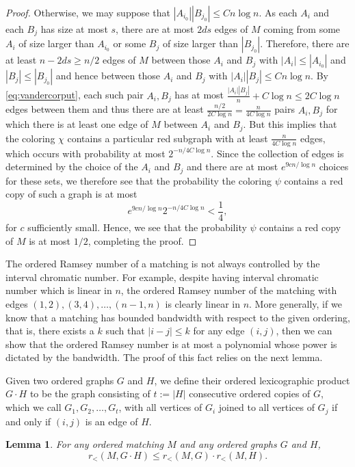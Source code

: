 \documentclass[11pt]{article}
\newtheorem{lemma}[theorem]{Lemma}
\begin{document}
\begin{proof}
Otherwise, we may suppose that $|A_{i_0}||B_{j_0}| \leq Cn \log n$. 
As each $A_i$ and each $B_j$ has size at most $s$, there are at most $2ds$ edges of $M$ coming from some $A_i$ of size larger than $A_{i_0}$ or some $B_j$ of size larger than $|B_{j_0}|$. Therefore, there are at least $n-2ds \geq n/2$ edges of $M$ between those $A_i$ and $B_j$ with $|A_i| \leq |A_{i_0}|$ and $|B_j|\leq |B_{j_0}|$ and hence between those $A_i$ and $B_j$ with $|A_i||B_j| \leq Cn \log n$. By \eqref{eq:vandercorput}, each such pair $A_i,B_j$ has at most $\frac{|A_i||B_j|}{n}+C\log n \leq 2C\log n$ edges between them and thus there are at least $\frac{n/2}{2C\log n}=\frac{n}{4C\log n}$ pairs $A_i,B_j$ for which there is at least one edge of $M$ between $A_i$ and $B_j$. But this implies that the coloring $\chi$ contains a particular red subgraph with at least $\frac{n}{4C\log n}$ edges, which occurs with probability at most $2^{-n/4C \log n}$.
Since the collection of edges is determined by the choice of the $A_i$ and $B_j$ and there are at most $e^{9c n/\log n}$ choices for these sets, we therefore see that the probability the coloring $\psi$ contains a red copy of such a graph is at most
\[
	e^{9c n/\log n} 2^{-n/4C \log n} < \frac{1}{4},
\] 
for $c$ sufficiently small. Hence, we see that the probability $\psi$ contains a red copy of $M$ is at most $1/2$, completing the proof. 
\end{proof}


The ordered Ramsey number of a matching is not always controlled by the interval chromatic number. For example, despite having interval chromatic number which is linear in $n$, the ordered Ramsey number of the matching with edges $(1, 2), (3,4), \dots, (n-1, n)$ is clearly linear in $n$. More generally, if we know that a matching has bounded bandwidth with respect to the given ordering, that is, there exists a $k$ such that $|i-j| \leq k$ for any edge $(i,j)$, then we can show that the ordered Ramsey number is at most a polynomial whose power is dictated by the bandwidth. The proof of this fact relies on the next lemma. 

Given two ordered graphs $G$ and $H$, we define their ordered lexicographic product $G \cdot H$ to be the graph consisting of $t := |H|$ consecutive ordered copies of $G$, which we call $G_1, G_2, \dots, G_t$, with all vertices of $G_i$ joined to all vertices of $G_j$ if and only if $(i, j)$ is an edge of $H$. 

\begin{lemma} \label{lem:lexprod}
For any ordered matching $M$ and any ordered graphs $G$ and $H$, 
\[r_< (M, G \cdot H) \leq r_<(M, G) \cdot r_< (M, H).\]
\end{lemma}
\end{document}
